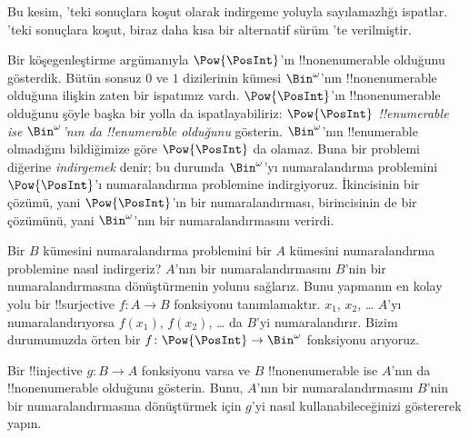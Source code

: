 



\begin{editorial}
  Bu kesim, 'teki sonuçlara koşut olarak indirgeme yoluyla
  sayılamazlığı ispatlar. 'teki sonuçlara koşut, biraz
  daha kısa bir alternatif sürüm 'te verilmiştir.
\end{editorial}

Bir köşegenleştirme argümanıyla $\Pow{\PosInt}$'ın !!{nonenumerable}
olduğunu gösterdik. Bütün sonsuz $0$ ve $1$ dizilerinin kümesi
$\Bin^\omega$'nın !!{nonenumerable} olduğuna ilişkin zaten bir ispatımız
vardı. $\Pow{\PosInt}$'ın !!{nonenumerable} olduğunu şöyle başka bir yolla
da ispatlayabiliriz: \emph{$\Pow{\PosInt}$ !!{enumerable} ise
$\Bin^\omega$'nın da !!{enumerable} olduğunu} gösterin. $\Bin^\omega$'nın
!!{enumerable} olmadığını bildiğimize göre $\Pow{\PosInt}$ da olamaz. Buna
bir problemi diğerine \emph{indirgemek} denir; bu durumda $\Bin^\omega$'yı
numaralandırma problemini $\Pow{\PosInt}$'ı numaralandırma problemine
indirgiyoruz. İkincisinin bir çözümü, yani $\Pow{\PosInt}$'ın bir
numaralandırması, birincisinin de bir çözümünü, yani $\Bin^\omega$'nın bir
numaralandırmasını verirdi.

Bir $B$ kümesini numaralandırma problemini bir $A$ kümesini numaralandırma
problemine nasıl indirgeriz? $A$'nın bir numaralandırmasını $B$'nin bir
numaralandırmasına dönüştürmenin yolunu sağlarız. Bunu yapmanın en kolay yolu
bir !!{surjective} $f\colon A\to B$ fonksiyonu tanımlamaktır. $x_1$, $x_2$,
\dots{} $A$'yı numaralandırıyorsa $f(x_1)$, $f(x_2)$, \dots{} da $B$'yi
numaralandırır. Bizim durumumuzda örten bir $f\colon\Pow{\PosInt}\to
\Bin^\omega$ fonksiyonu arıyoruz.

\begin{prob}
Bir !!{injective} $g\colon B\to A$ fonksiyonu varsa ve $B$
!!{nonenumerable} ise $A$'nın da !!{nonenumerable} olduğunu gösterin. Bunu,
$A$'nın bir numaralandırmasını $B$'nin bir numaralandırmasına dönüştürmek
için $g$'yi nasıl kullanabileceğinizi göstererek yapın.
\end{prob}

